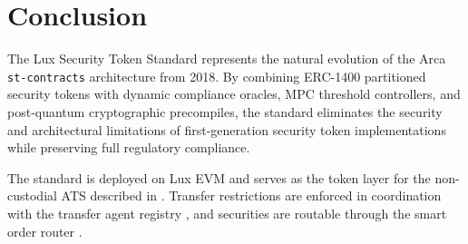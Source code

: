 \section{Conclusion}


The Lux Security Token Standard represents the natural evolution of the Arca \texttt{st-contracts} architecture from 2018. By combining ERC-1400 partitioned security tokens with dynamic compliance oracles, MPC threshold controllers, and post-quantum cryptographic precompiles, the standard eliminates the security and architectural limitations of first-generation security token implementations while preserving full regulatory compliance.

The standard is deployed on Lux EVM and serves as the token layer for the non-custodial ATS described in \cite{lux-ats-architecture}. Transfer restrictions are enforced in coordination with the transfer agent registry \cite{lux-transfer-agent}, and securities are routable through the smart order router \cite{lux-smart-order-routing}.

